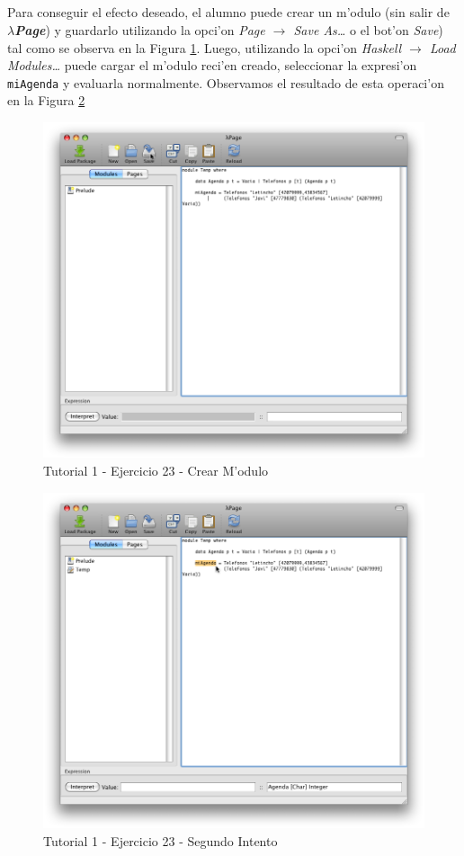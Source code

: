 \documentclass[a4paper]{article}
\newcommand{\hpage}{\textbf{\textsl{$\lambda$Page}}}
\begin{document}
\subparagraph{}Para conseguir el efecto deseado, el alumno puede crear un m'odulo (sin salir de \hpage) y guardarlo utilizando la opci'on \textsl{Page $\rightarrow$ Save As\ldots} o el bot'on \textsl{Save}) tal como se observa en la Figura \ref{tut110}.  Luego, utilizando la opci'on \textsl{Haskell $\rightarrow$ Load Modules\ldots} puede cargar el m'odulo reci'en creado, seleccionar la expresi'on \texttt{miAgenda} y evaluarla normalmente.  Observamos el resultado de esta operaci'on en la Figura \ref{tut111}
\begin{figure}[hp]
	\begin{center}
        	\includegraphics[width=.75\textwidth]{pictures/tut1/10}
		\caption{Tutorial 1 - Ejercicio 23 - Crear M'odulo}
		\label{tut110}
	\end{center}
\end{figure}
\begin{figure}[hp]
	\begin{center}
        	\includegraphics[width=.75\textwidth]{pictures/tut1/11}
		\caption{Tutorial 1 - Ejercicio 23 - Segundo Intento}
		\label{tut111}
	\end{center}
\end{figure}
\end{document}
